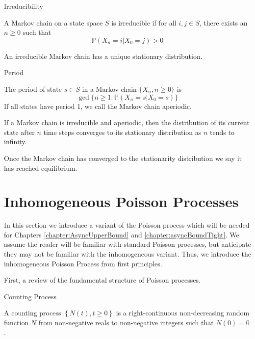\begin{definition}
	Irreducibility

	\noindent
	A Markov chain on a state space $S$ is irreducible if for all $i, j \in S$, there exists an $n \geq 0$ such that 
	$$
		\mathbb{P}(X_n = i | X_0 = j) > 0
	$$
\end{definition}

\begin{theorem}\label{theorem:uniqueStationaryDistribution}
	An irreducible Markov chain has a unique stationary distribution.
\end{theorem}

\begin{definition}
	Period

	\noindent
	The period of state $s \in S$ in a Markov chain $\{X_n, n \geq 0 \}$ is
	$$
		\gcd\{ n \geq 1 : \mathbb{P}(X_n = s | X_0 = s)\}
	$$
	If all states have period 1, we call the Markov chain aperiodic.
\end{definition}

\begin{theorem}\label{theorem:markovChainConvergence}
	If a Markov chain is irreducible and aperiodic, then the distribution of its current state after $n$ time steps converges to its stationary distribution as $n$ tends to infinity.
\end{theorem}

Once the Markov chain has converged to the stationarity distribution we say it has reached equilibrium.

\section{Inhomogeneous Poisson Processes}\label{section:inhomoPP}

In this section we introduce a variant of the Poisson process which will be needed for Chapters \ref{chapter:AsyncUpperBound} and \ref{chapter:asyncBoundTight}. We assume the reader will be familiar with standard Poisson processes, but anticipate they may not be familiar with the inhomogeneous variant. Thus, we introduce the inhomogeneous Poisson Process from first principles.

First, a review of the fundamental structure of Poisson processes.

\begin{definition}
	Counting Process

	\noindent
	A counting process $\left\{ N(t), t \geq 0 \right\}$ is a right-continuous non-decreasing random function $N$ from non-negative reals to non-negative integers such that $N(0) = 0$.
\end{definition}

